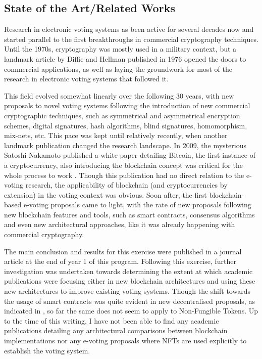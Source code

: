 \documentclass[../main.tex]{subfiles}
\begin{document}
\subsection{State of the Art/Related Works}
Research in electronic voting systems as been active for several decades now and started parallel to the first breakthroughs in commercial cryptography techniques. Until the 1970s, cryptography was mostly used in a military context, but a landmark article by Diffie and Hellman published in 1976 \cite{Diffie1976} opened the doors to commercial applications, as well as laying the groundwork for most of the research in electronic voting systems that followed it.
\par
This field evolved somewhat linearly over the following 30 years, with new proposals to novel voting systems following the introduction of new commercial cryptographic techniques, such as symmetrical and asymmetrical encryption schemes, digital signatures, hash algorithms, blind signatures, homomorphism, mix-nets, etc. This pace was kept until relatively recently, when another landmark publication changed the research landscape. In 2009, the mysterious Satoshi Nakamoto published a white paper detailing Bitcoin, the first instance of a cryptocurrency, also introducing the blockchain concept was critical for the whole process to work \cite{Nakamoto2008}. Though this publication had no direct relation to the e-voting research, the applicability of blockchain (and cryptocurrencies by extension) in the voting context was obvious. Soon after, the first blockchain-based e-voting proposals came to light, with the rate of new proposals following new blockchain features and tools, such as smart contracts, consensus algorithms and even new architectural approaches, like it was already happening with commercial cryptography.
\par
The main conclusion and results for this exercise were published in a journal article \cite{Almeida2023} at the end of year 1 of this program. Following this exercise, further investigation was undertaken towards determining the extent at which academic publications were focusing either in new blockchain architectures and using these new architectures to improve existing voting systems. Though the shift towards the usage of smart contracts was quite evident in new decentralised proposals, as indicated in \cite{Almeida2023}, so far the same does not seem to apply to Non-Fungible Tokens. Up to the time of this writing, I have not been able to find any academic publications detailing any architectural comparisons between blockchain implementations nor any e-voting proposals where NFTs are used explicitly to establish the voting system.
\end{document}
